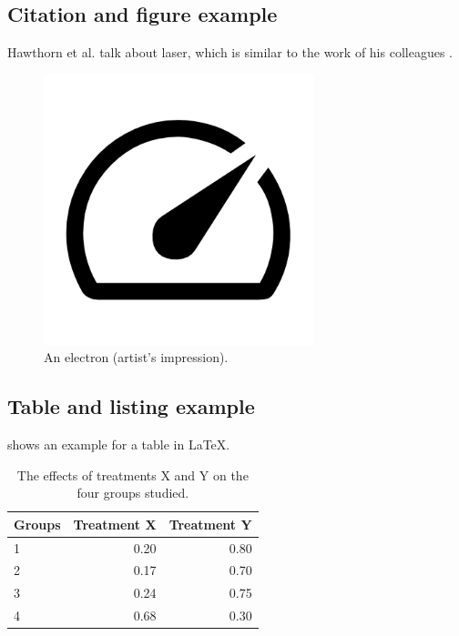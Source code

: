 \documentclass[12pt, a4paper, hidelinks]{article}
\begin{document}
\subsection{Citation and figure example}
Hawthorn et al. \cite{20220610_dodge_measuring-the-carbon-intensity-of-ai-in-cloud-instances} talk about laser, which is similar to the work of his colleagues \cite{20220610_dodge_measuring-the-carbon-intensity-of-ai-in-cloud-instances, 20220610_dodge_measuring-the-carbon-intensity-of-ai-in-cloud-instances}.
\begin{figure}[th]
\centering
\includegraphics[width=0.7\textwidth]{speed_FILL0_wght400_GRAD0_opsz48.png}
\caption[An Electron]{An electron (artist's impression).}
\label{fig:Electron}
\end{figure}

\subsection{Table and listing example}
 shows an example for a table in \LaTeX.
\begin{table}[th]
\label{tab:treatments}
\centering
\begin{tabularx}{0.45\textwidth}{l||r|r}
Groups & Treatment X & Treatment Y \\
\hline \hline
1 & 0.20 & 0.80\\
2 & 0.17 & 0.70\\
3 & 0.24 & 0.75\\
4 & 0.68 & 0.30\\
\end{tabularx}
\caption{The effects of treatments X and Y on the four groups studied.}
\end{table}
\end{document}
